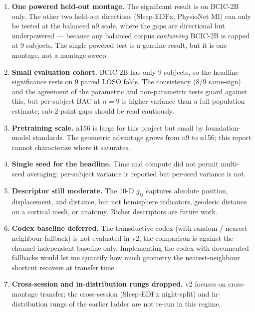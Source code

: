 \documentclass[11pt]{article}
\begin{document}
\begin{enumerate}[leftmargin=*, itemsep=3pt, topsep=2pt]
  \item \textbf{One powered held-out montage.}
        The significant result is on BCIC-2B only. The other two held-out
        directions (Sleep-EDFx, PhysioNet MI) can only be tested at the
        balanced n9 scale, where the gaps are directional but underpowered
        --- because any balanced corpus \emph{containing} BCIC-2B is capped
        at 9 subjects. The single powered test is a genuine result, but it
        is one montage, not a montage sweep.
  \item \textbf{Small evaluation cohort.}
        BCIC-2B has only 9 subjects, so the headline significance rests on 9
        paired LOSO folds. The consistency (8/9 same-sign) and the agreement
        of the parametric and non-parametric tests guard against this, but
        per-subject BAC at $n=9$ is higher-variance than a full-population
        estimate; sub-2-point gaps should be read cautiously.
  \item \textbf{Pretraining scale.}
        n156 is large for this project but small by foundation-model
        standards. The geometric advantage grows from n9 to n156; this
        report cannot characterize where it saturates.
  \item \textbf{Single seed for the headline.}
        Time and compute did not permit multi-seed averaging; per-subject
        variance is reported but per-seed variance is not.
  \item \textbf{Descriptor still moderate.}
        The 10-D $g_{ij}$ captures absolute position, displacement, and
        distance, but not hemisphere indicators, geodesic distance on a
        cortical mesh, or anatomy. Richer descriptors are future work.
  \item \textbf{Codex baseline deferred.}
        The transductive codex (with random / nearest-neighbour fallback) is
        not evaluated in v2; the comparison is against the channel-independent
        baseline only. Implementing the codex with documented fallbacks would
        let me quantify how much geometry the nearest-neighbour shortcut
        recovers at transfer time.
  \item \textbf{Cross-session and in-distribution rungs dropped.}
        v2 focuses on cross-montage transfer; the cross-session
        (Sleep-EDFx night-split) and in-distribution rungs of the earlier
        ladder are not re-run in this regime.
\end{enumerate}
\end{document}
